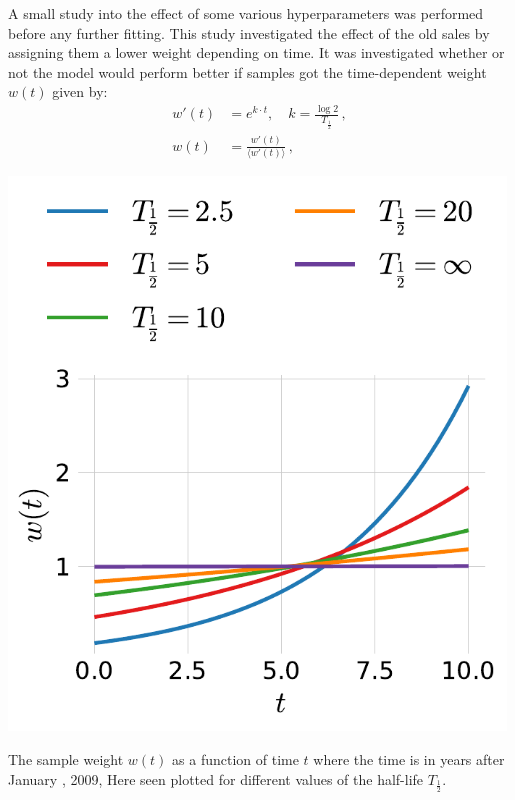 A small study into the effect of some various hyperparameters was performed before any further fitting. This study investigated the effect of the old sales by assigning them a lower weight depending on time. It was investigated whether or not the model would perform better if samples got the time-dependent weight $w(t)$ given by:
\begin{equation}
  \begin{split}
    w'(t) &= e^{ k \cdot t}, \quad k = \frac{\log 2}{T_{\frac{1}{2}}} \, ,\\
    w(t) &= \frac{w'(t)}{\langle w'(t) \rangle} \, ,
  \end{split}
  \label{eg:h:sample_weight}
\end{equation}
\begin{marginfigure}[-4cm]
  \includegraphics[width=0.99\textwidth]{figures/housing/Villa_v18_cut_all_Ncols_all_half_life_weights.pdf}
  \caption[Sample Weight as a Function of Time for Different Half-Lives.]
    {The sample weight $w(t)$ as a function of time $t$ where the time is in years after January , 2009, Here seen plotted for different values of the half-life $T_{\frac{1}{2}}$.}
  \label{fig:h:half-life}
\end{marginfigure}
